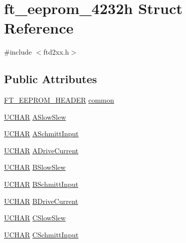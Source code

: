\hypertarget{structft__eeprom__4232h}{
\section{ft\_\-eeprom\_\-4232h Struct Reference}
\label{structft__eeprom__4232h}
}


{\ttfamily \#include $<$ftd2xx.h$>$}\subsection*{Public Attributes}
\begin{DoxyCompactItemize}
\item 
\hyperlink{structft__eeprom__header}{FT\_\-EEPROM\_\-HEADER} \hyperlink{structft__eeprom__4232h_acfee0a972954d9a20c82fcd18b082194}{common}
\item 
\hyperlink{LALUsbx64_2include_2WinTypes_8h_a4f4bb67531a9bf6f0b9c6ad76aeba587}{UCHAR} \hyperlink{structft__eeprom__4232h_a1e66ea6b513734d830d86565441b6318}{ASlowSlew}
\item 
\hyperlink{LALUsbx64_2include_2WinTypes_8h_a4f4bb67531a9bf6f0b9c6ad76aeba587}{UCHAR} \hyperlink{structft__eeprom__4232h_a47fdc0898935fa1d2c60cfcf93685231}{ASchmittInput}
\item 
\hyperlink{LALUsbx64_2include_2WinTypes_8h_a4f4bb67531a9bf6f0b9c6ad76aeba587}{UCHAR} \hyperlink{structft__eeprom__4232h_a67ec1ef6e8b91116d539dd304c9c6f53}{ADriveCurrent}
\item 
\hyperlink{LALUsbx64_2include_2WinTypes_8h_a4f4bb67531a9bf6f0b9c6ad76aeba587}{UCHAR} \hyperlink{structft__eeprom__4232h_acd3e611ccee7fc8be7c459e6a436efda}{BSlowSlew}
\item 
\hyperlink{LALUsbx64_2include_2WinTypes_8h_a4f4bb67531a9bf6f0b9c6ad76aeba587}{UCHAR} \hyperlink{structft__eeprom__4232h_a8bb143cc9d051960d4aa6fc9be3230d4}{BSchmittInput}
\item 
\hyperlink{LALUsbx64_2include_2WinTypes_8h_a4f4bb67531a9bf6f0b9c6ad76aeba587}{UCHAR} \hyperlink{structft__eeprom__4232h_ac42c22b82bdca1458089ac49f0eaefa1}{BDriveCurrent}
\item 
\hyperlink{LALUsbx64_2include_2WinTypes_8h_a4f4bb67531a9bf6f0b9c6ad76aeba587}{UCHAR} \hyperlink{structft__eeprom__4232h_a6d92eb606cbe5c251751cd2d6fd8bebe}{CSlowSlew}
\item 
\hyperlink{LALUsbx64_2include_2WinTypes_8h_a4f4bb67531a9bf6f0b9c6ad76aeba587}{UCHAR} \hyperlink{structft__eeprom__4232h_a30fb25eb86d7e47668b6a044e6196705}{CSchmittInput}
\item 

\end{DoxyCompactItemize}
